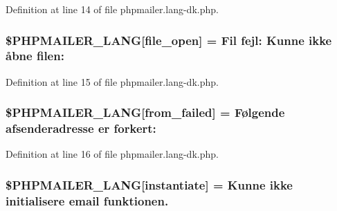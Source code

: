 Definition at line 14 of file phpmailer.\+lang-\/dk.\+php.

\subsubsection[{\texorpdfstring{\$\+P\+H\+P\+M\+A\+I\+L\+E\+R\+\_\+\+L\+A\+NG}{$PHPMAILER_LANG}}]{\setlength{\rightskip}{0pt plus 5cm}\$P\+H\+P\+M\+A\+I\+L\+E\+R\+\_\+\+L\+A\+NG\mbox{[}\textquotesingle{}file\+\_\+open\textquotesingle{}\mbox{]} = \textquotesingle{}Fil fejl\+: Kunne ikke åbne filen\+: \textquotesingle{}}\hypertarget{phpmailer_8lang-dk_8php_a28d1a6517bf4c942a0ddd506188ad2e0}{}\label{phpmailer_8lang-dk_8php_a28d1a6517bf4c942a0ddd506188ad2e0}


Definition at line 15 of file phpmailer.\+lang-\/dk.\+php.

\subsubsection[{\texorpdfstring{\$\+P\+H\+P\+M\+A\+I\+L\+E\+R\+\_\+\+L\+A\+NG}{$PHPMAILER_LANG}}]{\setlength{\rightskip}{0pt plus 5cm}\$P\+H\+P\+M\+A\+I\+L\+E\+R\+\_\+\+L\+A\+NG\mbox{[}\textquotesingle{}from\+\_\+failed\textquotesingle{}\mbox{]} = \textquotesingle{}Følgende afsenderadresse er forkert\+: \textquotesingle{}}\hypertarget{phpmailer_8lang-dk_8php_adf832ae12155a09be077c6d5e4fd7e22}{}\label{phpmailer_8lang-dk_8php_adf832ae12155a09be077c6d5e4fd7e22}


Definition at line 16 of file phpmailer.\+lang-\/dk.\+php.

\subsubsection[{\texorpdfstring{\$\+P\+H\+P\+M\+A\+I\+L\+E\+R\+\_\+\+L\+A\+NG}{$PHPMAILER_LANG}}]{\setlength{\rightskip}{0pt plus 5cm}\$P\+H\+P\+M\+A\+I\+L\+E\+R\+\_\+\+L\+A\+NG\mbox{[}\textquotesingle{}instantiate\textquotesingle{}\mbox{]} = \textquotesingle{}Kunne ikke initialisere {\bf email} funktionen.\textquotesingle{}}\hypertarget{phpmailer_8lang-dk_8php_ad58dde16780f4770ccf4dd282ea1f5ad}{}\label{phpmailer_8lang-dk_8php_ad58dde16780f4770ccf4dd282ea1f5ad}


